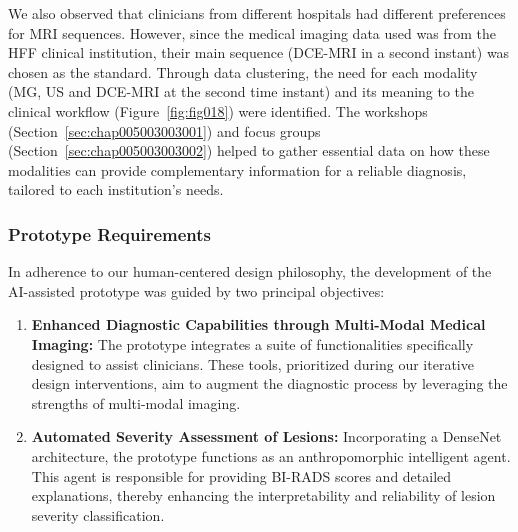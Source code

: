 We also observed that clinicians from different hospitals had different preferences for \ac{MRI} sequences.
However, since the medical imaging data used was from the \acs{HFF} clinical institution, their main sequence (\acs{DCE-MRI} in a second instant) was chosen as the standard.
Through data clustering, the need for each modality (\acs{MG}, \acs{US} and \acs{DCE-MRI} at the second time instant) and its meaning to the clinical workflow (Figure~\ref{fig:fig018}) were identified.
The workshops (Section~\ref{sec:chap005003003001}) and focus groups (Section~\ref{sec:chap005003003002}) helped to gather essential data on how these modalities can provide complementary information for a reliable diagnosis, tailored to each institution's needs.

\subsubsection{Prototype Requirements}
\label{sec:chap005003003005}


\noindent
\textcolor{revised}{In adherence to our human-centered design philosophy, the development of the \ac{AI}-assisted prototype was guided by two principal objectives:}

\vspace{1.00mm}


\begin{enumerate}
\item \textcolor{revised}{\textbf{Enhanced Diagnostic Capabilities through Multi-Modal Medical Imaging:} The prototype integrates a suite of functionalities specifically designed to assist clinicians.
These tools, prioritized during our iterative design interventions, aim to augment the diagnostic process by leveraging the strengths of multi-modal imaging.}
\item \textcolor{revised}{\textbf{Automated Severity Assessment of Lesions:} Incorporating a DenseNet architecture, the prototype functions as an anthropomorphic intelligent agent.
This agent is responsible for providing \ac{BI-RADS} scores and detailed explanations, thereby enhancing the interpretability and reliability of lesion severity classification.}
\end{enumerate}


